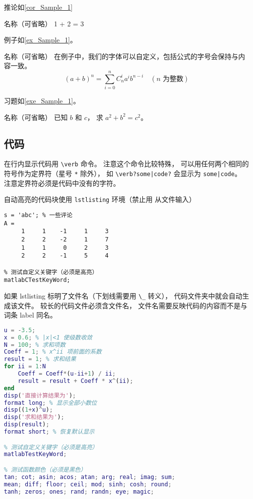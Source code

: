 推论如\autoref{cor_Sample_1}
\begin{corollary}{名称（可省略）}\label{cor_Sample_1}
1 + 2 = 3
\end{corollary}

例子如\autoref{ex_Sample_1}。 
\begin{example}{名称（可省略）}\label{ex_Sample_1}
在例子中，我们的字体可以自定义，包括公式的字号会保持与内容一致。
\begin{equation}
(a+b)^n = \sum_{i=0}^n C_n^i a^i b^{n-i} \quad (\text{$n$ 为整数})
\end{equation}
\end{example}

习题如\autoref{exe_Sample_1}。 
\begin{exercise}{名称（可省略）}\label{exe_Sample_1}
已知 $b$ 和 $c$， 求 $a^2 + b^2 = c^2$。
\end{exercise}

\subsection{代码}
在行内显示代码用 \verb|\verb| 命令。 注意这个命令比较特殊， 可以用任何两个相同的符号作为定界符（星号 \verb|*| 除外）， 如 \verb+\verb?some|code?+ 会显示为 \verb?some|code?。 注意定界符必须是代码中没有的字符。

自动高亮的代码块使用 \verb|lstlisting| 环境（禁止用 \verb|| 从文件输入）
\begin{lstlisting}[language=matlabC]
s = 'abc'; % 一些评论
A =
     1     1    -1     1     3
     2     2    -2     1     7
     1     1     0     2     3
     2     2    -1     5     4

% 测试自定义关键字（必须是高亮）
matlabCTestKeyWord;
\end{lstlisting}

如果 lstlisting 标明了文件名（下划线需要用 \verb|\_| 转义）， 代码文件夹中就会自动生成该文件。 较长的代码文件必须含文件名， 文件名需要反映代码的内容而不是与词条 label 同名。

\begin{lstlisting}[language=matlab, caption=sample\_code.m]
% 验证二项式定理(非整数幂)
u = -3.5;
x = 0.6; % |x|<1 使级数收敛
N = 100; % 求和项数
Coeff = 1; % x^ii 项前面的系数
result = 1; % 求和结果
for ii = 1:N
    Coeff = Coeff*(u-ii+1) / ii;
    result = result + Coeff * x^(ii);
end
disp('直接计算结果为');
format long; % 显示全部小数位
disp((1+x)^u);
disp('求和结果为');
disp(result);
format short; % 恢复默认显示

% 测试自定义关键字（必须是高亮）
matlabTestKeyWord;

% 测试函数颜色（必须是黑色）
tan; cot; asin; acos; atan; arg; real; imag; sum;
mean; diff; floor; ceil; mod; sinh; cosh; round;
tanh; zeros; ones; rand; randn; eye; magic;
\end{lstlisting}

